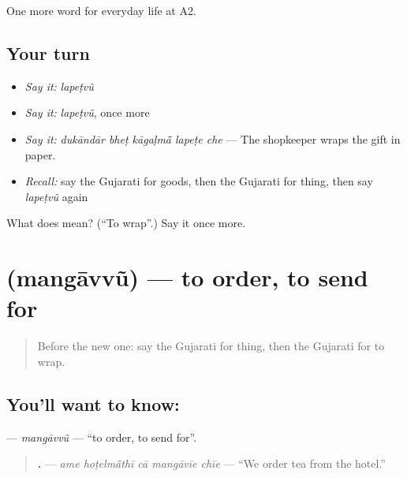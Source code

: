 \begin{grammarlens}[title={What you've built}]
One more word for everyday life at A2.
\end{grammarlens}

\subsection*{Your turn}
\begin{itemize}
\raggedright
  \item \emph{Say it:} \emph{lapeṭvũ}
  \item \emph{Say it:} \emph{lapeṭvũ}, once more
  \item \emph{Say it:} \emph{dukāndār bheṭ kāgaḷmā̃ lapeṭe che} — The shopkeeper wraps the gift in paper.
  \item \emph{Recall:} say the Gujarati for goods, then the Gujarati for thing, then say \emph{lapeṭvũ} again
\end{itemize}

\begin{tcolorbox}[breakable,colback=teal!4,colframe=teal!35!black,title={Before you move on}]
What does  mean? (\textquotedblleft{}To wrap\textquotedblright{}.) Say it once more.
\end{tcolorbox}
\section[\texorpdfstring{\gu{મંગાવવું} (mangāvvũ)}{મંગાવવું (mangāvvũ)}]{ (mangāvvũ) — to order, to send for}

\label{lesson:GU-C189-mangavvu}



\begin{quote}
Before the new one: say the Gujarati for thing, then the Gujarati for to wrap.
\end{quote}

\subsection*{You'll want to know: }
\textbf{} — \emph{mangāvvũ} — \textquotedblleft{}to order, to send for\textquotedblright{}.

\begin{quote}
\textbf{    .} — \emph{ame hoṭelmā̃thī cā mangāvīe chīe} — \textquotedblleft{}We order tea from the hotel.\textquotedblright{}
\end{quote}

